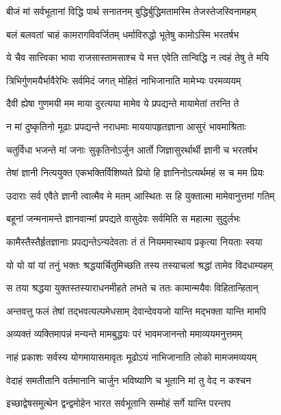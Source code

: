 \twolineshloka
{बीजं मां सर्वभूतानां विद्धि पार्थ सनातनम्}
{बुद्धिर्बुद्धिमतामस्मि तेजस्तेजस्विनामहम्}%

\twolineshloka
{बलं बलवतां चाहं कामरागविवर्जितम्}
{धर्माविरुद्धो भूतेषु कामोऽस्मि भरतर्षभ}%

\twolineshloka
{ये चैव सात्त्विका भावा राजसास्तामसाश्च ये}
{मत्त एवेति तान्विद्धि न त्वहं तेषु ते मयि}%

\twolineshloka
{त्रिभिर्गुणमयैर्भावैरेभिः सर्वमिदं जगत्}
{मोहितं नाभिजानाति मामेभ्यः परमव्ययम्}%

\twolineshloka
{दैवी ह्येषा गुणमयी मम माया दुरत्यया}
{मामेव ये प्रपद्यन्ते मायामेतां तरन्ति ते}%

\twolineshloka
{न मां दुष्कृतिनो मूढाः प्रपद्यन्ते नराधमाः}
{माययापहृतज्ञाना आसुरं भावमाश्रिताः}%

\twolineshloka
{चतुर्विधा भजन्ते मां जनाः सुकृतिनोऽर्जुन}
{आर्तो जिज्ञासुरर्थार्थी ज्ञानी च भरतर्षभ}%

\twolineshloka
{तेषां ज्ञानी नित्ययुक्त एकभक्तिर्विशिष्यते}
{प्रियो हि ज्ञानिनोऽत्यर्थमहं स च मम प्रियः}%

\twolineshloka
{उदाराः सर्व एवैते ज्ञानी त्वात्मैव मे मतम्}
{आस्थितः स हि युक्तात्मा मामेवानुत्तमां गतिम्}%

\twolineshloka
{बहूनां जन्मनामन्ते ज्ञानवान्मां प्रपद्यते}
{वासुदेवः सर्वमिति स महात्मा सुदुर्लभः}%

\twolineshloka
{कामैस्तैस्तैर्हृतज्ञानाः प्रपद्यन्तेऽन्यदेवताः}
{तं तं नियममास्थाय प्रकृत्या नियताः स्वया}%

\twolineshloka
{यो यो यां यां तनुं भक्तः श्रद्धयार्चितुमिच्छति}
{तस्य तस्याचलां श्रद्धां तामेव विदधाम्यहम्}%

\twolineshloka
{स तया श्रद्धया युक्तस्तस्याराधनमीहते}
{लभते च ततः कामान्मयैवः विहितान्हितान्}%

\twolineshloka
{अन्तवत्तु फलं तेषां तद्भवत्यल्पमेधसाम्}
{देवान्देवयजो यान्ति मद्भक्ता यान्ति मामपि}%

\twolineshloka
{अव्यक्तं व्यक्तिमापन्नं मन्यन्ते मामबुद्धयः}
{परं भावमजानन्तो ममाव्ययमनुत्तमम्}%

\twolineshloka
{नाहं प्रकाशः सर्वस्य योगमायासमावृतः}
{मूढोऽयं नाभिजानाति लोको मामजमव्ययम्}%

\twolineshloka
{वेदाहं समतीतानि वर्तमानानि चार्जुन}
{भविष्याणि च भूतानि मां तु वेद न कश्चन}%

\twolineshloka
{इच्छाद्वेषसमुत्थेन द्वन्द्वमोहेन भारत}
{सर्वभूतानि सम्मोहं सर्गे यान्ति परन्तप}%

